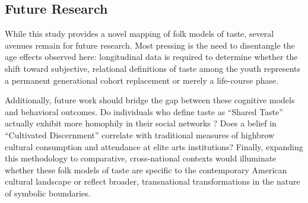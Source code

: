 \documentclass[12pt,letterpaper]{article}
\begin{document}
\subsection{Future Research}
While this study provides a novel mapping of folk models of taste, several avenues remain for future research. Most pressing is the need to disentangle the age effects observed here: longitudinal data is required to determine whether the shift toward subjective, relational definitions of taste among the youth represents a permanent generational cohort replacement or merely a life-course phase. 

Additionally, future work should bridge the gap between these cognitive models and behavioral outcomes. Do individuals who define taste as ``Shared Taste'' actually exhibit more homophily in their social networks \citep{vaisey2010can-b9a}? Does a belief in ``Cultivated Discernment'' correlate with traditional measures of highbrow cultural consumption and attendance at elite arts institutions? Finally, expanding this methodology to comparative, cross-national contexts would illuminate whether these folk models of taste are specific to the contemporary American cultural landscape or reflect broader, transnational transformations in the nature of symbolic boundaries.

\newpage


\end{document}
